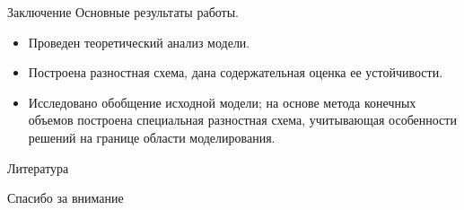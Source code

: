 \documentclass[aspectratio=169]{beamer}
\begin{document}
\begin{frame}{Заключение}
Основные результаты работы.
\begin{itemize}
    \item Проведен теоретический анализ модели.
    \item Построена разностная схема, дана содержательная оценка ее устойчивости.
    \item Исследовано обобщение исходной модели; на основе метода конечных объемов построена
    специальная разностная схема, учитывающая особенности решений на границе области моделирования.
\end{itemize}
\end{frame}


\begin{frame}{Литература}
\printbibliography
\end{frame}


\begin{frame}{}
\begin{center}
	\Large
	Спасибо за внимание
\end{center}
\end{frame}
\end{document}

